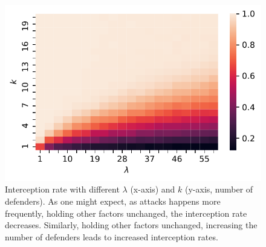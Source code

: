 \begin{figure}[h!]
    \vspace{-2mm}
    \centering
    \includegraphics[width=0.5\linewidth]{chapters/bd/fig/lambda.pdf}
    \vspace{-2mm}
    \caption[Interception rate with different $\lambda$ (x-axis) and number of defenders]
    {Interception rate with different $\lambda$ (x-axis) and $k$ (y-axis, number of defenders). As one might expect, as attacks happens more frequently, holding other factors unchanged, the interception rate decreases. Similarly, holding other factors unchanged, increasing the number of defenders leads to increased interception rates.}
    \label{fig:bd-lambda}
    \vspace{-2mm}
\end{figure}


